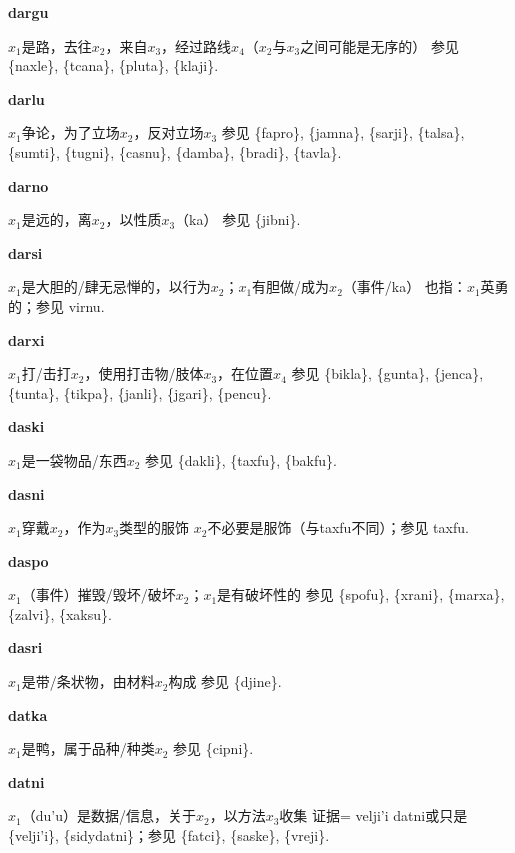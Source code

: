 \documentclass[notitlepage,twocolumn,a4paper,10pt]{book}
\begin{document}
{\sffamily\bfseries dargu}\enspace {\ttfamily\bfseries[dag]}  $x_1$是路，去往$x_2$，来自$x_3$，经过路线$x_4$（$x_2$与$x_3$之间可能是无序的） \textemdash{} 参见 \{naxle\}, \{tcana\}, \{pluta\}, \{klaji\}.

{\sffamily\bfseries darlu}\enspace {\ttfamily\bfseries[        dau]}  $x_1$争论，为了立场$x_2$，反对立场$x_3$ \textemdash{} 参见 \{fapro\}, \{jamna\}, \{sarji\}, \{talsa\}, \{sumti\}, \{tugni\}, \{casnu\}, \{damba\}, \{bradi\}, \{tavla\}.

{\sffamily\bfseries darno}\enspace {\ttfamily\bfseries[dar     da'o]}  $x_1$是远的，离$x_2$，以性质$x_3$（ka） \textemdash{} 参见 \{jibni\}.

{\sffamily\bfseries darsi} $x_1$是大胆的\slash{}肆无忌惮的，以行为$x_2$；$x_1$有胆做\slash{}成为$x_2$（事件\slash{}ka） \textemdash{} 也指：$x_1$英勇的；参见 {virnu}.

{\sffamily\bfseries darxi}\enspace {\ttfamily\bfseries[dax     da'i]}  $x_1$打\slash{}击打$x_2$，使用打击物\slash{}肢体$x_3$，在位置$x_4$ \textemdash{} 参见 \{bikla\}, \{gunta\}, \{jenca\}, \{tunta\}, \{tikpa\}, \{janli\}, \{jgari\}, \{pencu\}.

{\sffamily\bfseries daski} $x_1$是一袋物品\slash{}东西$x_2$ \textemdash{} 参见 \{dakli\}, \{taxfu\}, \{bakfu\}.

{\sffamily\bfseries dasni}\enspace {\ttfamily\bfseries[das]}  $x_1$穿戴$x_2$，作为$x_3$类型的服饰 \textemdash{} $x_2$不必要是服饰（与taxfu不同）；参见 {taxfu}.

{\sffamily\bfseries daspo}\enspace {\ttfamily\bfseries[    spo]}  $x_1$（事件）摧毁\slash{}毁坏\slash{}破坏$x_2$；$x_1$是有破坏性的 \textemdash{} 参见 \{spofu\}, \{xrani\}, \{marxa\}, \{zalvi\}, \{xaksu\}.

{\sffamily\bfseries dasri}\enspace {\ttfamily\bfseries[    sri]}  $x_1$是带\slash{}条状物，由材料$x_2$构成 \textemdash{} 参见 \{djine\}.

{\sffamily\bfseries datka} $x_1$是鸭，属于品种\slash{}种类$x_2$ \textemdash{} 参见 \{cipni\}.

{\sffamily\bfseries datni} $x_1$（du'u）是数据\slash{}信息，关于$x_2$，以方法$x_3$收集 \textemdash{} 证据= velji'i datni或只是 \{velji'i\}, \{sidydatni\}；参见 \{fatci\}, \{saske\}, \{vreji\}.
\end{document}
